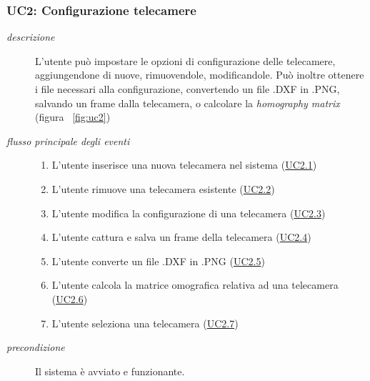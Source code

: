 \subsubsection{UC2: Configurazione telecamere} \label{sec:UC2}
\begin{description}
\item[\em{descrizione }]L'utente può impostare le opzioni di configurazione delle telecamere, aggiungendone di nuove, rimuovendole, modificandole. Può inoltre ottenere i file necessari alla configurazione, convertendo un file .DXF in .PNG, salvando un frame dalla telecamera, o calcolare la \textit{homography matrix} (figura ~\ref{fig:uc2})
\item[\em{flusso principale degli eventi }] \mbox{}
\begin{enumerate}
\item L'utente inserisce una nuova telecamera nel sistema (\hyperref[sec:uc2.1]{UC2.1})
\item L'utente rimuove una telecamera esistente (\hyperref[sec:uc2.2]{UC2.2})
\item L'utente modifica la configurazione di una telecamera (\hyperref[sec:uc2.3]{UC2.3})
\item L'utente cattura e salva un frame della telecamera (\hyperref[sec:uc2.4]{UC2.4})
\item L'utente converte un file .DXF in .PNG (\hyperref[sec:uc2.5]{UC2.5})
\item L'utente calcola la matrice omografica relativa ad una telecamera (\hyperref[sec:uc2.6]{UC2.6})
\item L'utente seleziona una telecamera (\hyperref[sec:uc2.7]{UC2.7})
\end{enumerate}
\item[\em{precondizione }] Il sistema è avviato e funzionante.
\end{description}

